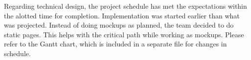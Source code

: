 

Regarding technical design, the project schedule has met the expectations within the alotted time for completion. Implementation was started earlier than what was projected. Instead of doing mockups as planned, the team decided to do static pages. This helps with the critical path while working as mockups. Please refer to the Gantt chart, which is included in a separate file for changes in schedule. 

